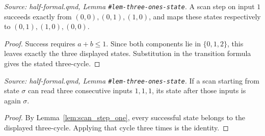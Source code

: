 \begin{lemma}
  \label{lem:scan_step_one}
  \textit{Source: half-formal.qmd, Lemma \texttt{\#lem-three-ones-state}.}
  A scan step on input \(1\) succeeds exactly from
  \((0,0),(0,1),(1,0)\), and maps these states respectively to
  \((0,1),(1,0),(0,0)\).
\end{lemma}
\begin{proof}

\leanok
  Success requires \(a+b\leq1\).  Since both components lie in
  \(\{0,1,2\}\), this leaves exactly the three displayed states.
  Substitution in the transition formula gives the stated three-cycle.
\end{proof}

\begin{lemma}
  \label{lem:scan_three_ones}
  \textit{Source: half-formal.qmd, Lemma \texttt{\#lem-three-ones-state}.}
  If a scan starting from state \(\sigma\) can read three consecutive
  inputs \(1,1,1\), its state after those inputs is again \(\sigma\).
\end{lemma}
\begin{proof}

\leanok
  By Lemma~\ref{lem:scan_step_one}, every successful state belongs to the
  displayed three-cycle.  Applying that cycle three times is the identity.
\end{proof}
